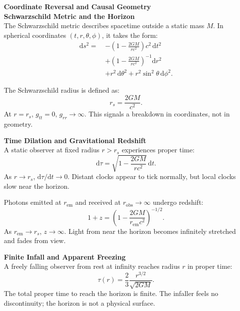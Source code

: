 \begin{technical}
{\Large\textbf{Coordinate Reversal and Causal Geometry}}\\[0.7em]

\noindent\textbf{Schwarzschild Metric and the Horizon}\\[0.5em]
The Schwarzschild metric describes spacetime outside a static mass \(M\). In spherical coordinates \((t, r, \theta, \phi)\), it takes the form:
\begin{align}
\mathrm{d}s^2 =\ 
& -\left(1 - \frac{2GM}{rc^2}\right)c^2\,\mathrm{d}t^2 \nonumber \\
& + \left(1 - \frac{2GM}{rc^2}\right)^{-1}\mathrm{d}r^2 \nonumber \\
& + r^2\,\mathrm{d}\theta^2 + r^2\sin^2\theta\,\mathrm{d}\phi^2.
\end{align}

The Schwarzschild radius is defined as:
\[
r_s = \frac{2GM}{c^2}.
\]
At \(r = r_s\), \(g_{tt} = 0\), \(g_{rr} \to \infty\). This signals a breakdown in coordinates, not in geometry.

\vspace{0.7em}
\noindent\textbf{Time Dilation and Gravitational Redshift}\\[0.5em]
A static observer at fixed radius \(r > r_s\) experiences proper time:
\begin{equation}
\mathrm{d}\tau = \sqrt{1 - \frac{2GM}{rc^2}}\,\mathrm{d}t.
\end{equation}
As \(r \to r_s\), \(\mathrm{d}\tau/\mathrm{d}t \to 0\). Distant clocks appear to tick normally, but local clocks slow near the horizon.

Photons emitted at \(r_{\text{em}}\) and received at \(r_{\text{obs}} \to \infty\) undergo redshift:
\begin{equation}
1 + z = \left(1 - \frac{2GM}{r_{\text{em}}c^2}\right)^{-1/2}.
\end{equation}
As \(r_{\text{em}} \to r_s\), \(z \to \infty\). Light from near the horizon becomes infinitely stretched and fades from view.

\vspace{0.7em}
\noindent\textbf{Finite Infall and Apparent Freezing}\\[0.5em]
A freely falling observer from rest at infinity reaches radius \(r\) in proper time:
\begin{equation}
\tau(r) = \frac{2}{3}\frac{r^{3/2}}{\sqrt{2GM}}.
\end{equation}
The total proper time to reach the horizon is finite. The infaller feels no discontinuity; the horizon is not a physical surface.


\end{technical}
